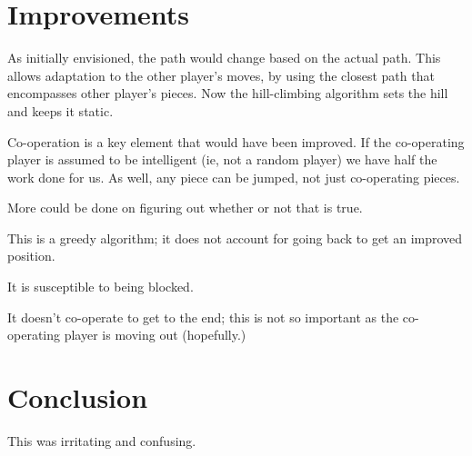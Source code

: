 \documentclass[twocolumn]{article}
\begin{document}

\section{Improvements}


As initially envisioned, the path would change based on the actual path. This allows adaptation to the other player's moves, by using the closest path that encompasses other player's pieces. Now the hill-climbing algorithm sets the hill and keeps it static.

Co-operation is a key element that would have been improved. If the co-operating player is assumed to be intelligent (ie, not a random player) we have half the work done for us. As well, any piece can be jumped, not just co-operating pieces.

More could be done on figuring out whether or not that is true.

This is a greedy algorithm; it does not account for going back to get an improved position.

It is susceptible to being blocked.

It doesn't co-operate to get to the end; this is not so important as the co-operating player is moving out (hopefully.)

\section{Conclusion}

This was irritating and confusing.


\end{document}
